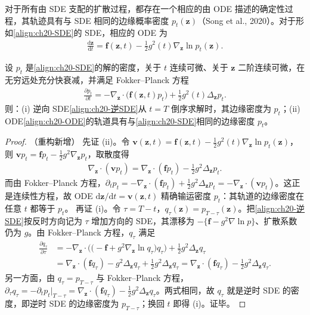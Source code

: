 \documentclass[../../main.tex]{subfiles}
\begin{document}
对于所有由 SDE 支配的扩散过程，都存在一个相应的由 ODE 描述的确定性过程，其轨迹具有与 SDE 相同的边缘概率密度 $p_t(\bm{z})$（Song et al., 2020）。对于形如\eqref{align:ch20-SDE}的 SDE，相应的 ODE 为
\begin{align}
\frac{\mathrm{d}\bm{z}}{\mathrm{d}t}=\bm{f}(\bm{z},t)-\frac{1}{2}g^2(t)\nabla_{\bm{z}}\ln p_t(\bm{z}).
\label{align:ch20-ODE}
\end{align}

\begin{proposition}\label{proposition:ch20-逆时SDE}
设 $p_t$ 是\eqref{align:ch20-SDE}的解的密度，关于 $t$ 连续可微、关于 $\bm{z}$ 二阶连续可微，在无穷远处充分快衰减，并满足 Fokker--Planck 方程
\begin{align*}
\frac{\partial p_t}{\partial t}=-\nabla_{\bm{z}}\cdot\big(\bm{f}(\bm{z},t)p_t\big)+\frac{1}{2}g^2(t)\Delta_{\bm{z}}p_t.
\end{align*}
则：(i) 逆向 SDE\eqref{align:ch20-逆SDE}从 $t=T$ 倒序求解时，其边缘密度为 $p_t$；(ii) ODE\eqref{align:ch20-ODE}的轨道具有与\eqref{align:ch20-SDE}相同的边缘密度 $p_t$。
\end{proposition}

\begin{proof}（重构新增）
先证 (ii)。令 $\bm{v}(\bm{z},t)=\bm{f}(\bm{z},t)-\frac{1}{2}g^2(t)\nabla_{\bm{z}}\ln p_t(\bm{z})$，则 $\bm{v}p_t=\bm{f}p_t-\frac{1}{2}g^2\nabla_{\bm{z}}p_t$，取散度得
\begin{align*}
\nabla_{\bm{z}}\cdot(\bm{v}p_t)=\nabla_{\bm{z}}\cdot(\bm{f}p_t)-\frac{1}{2}g^2\Delta_{\bm{z}}p_t.
\end{align*}
而由 Fokker--Planck 方程，$\partial_tp_t=-\nabla_{\bm{z}}\cdot(\bm{f}p_t)+\frac{1}{2}g^2\Delta_{\bm{z}}p_t=-\nabla_{\bm{z}}\cdot(\bm{v}p_t)$。这正是连续性方程，故 ODE $\mathrm{d}\bm{z}/\mathrm{d}t=\bm{v}(\bm{z},t)$ 精确输运密度 $p_t$：其轨道的边缘密度在任意 $t$ 都等于 $p_t$。
再证 (i)。令 $\tau=T-t$，$q_{\tau}(\bm{z})=p_{T-\tau}(\bm{z})$。把\eqref{align:ch20-逆SDE}按反时方向记为 $\tau$ 增加方向的 SDE，其漂移为 $-\big\{\bm{f}-g^2\nabla\ln p\big\}$、扩散系数仍为 $g$。由 Fokker--Planck 方程，$q_{\tau}$ 满足
\begin{align*}
\frac{\partial q_{\tau}}{\partial\tau}&=-\nabla_{\bm{z}}\cdot\Big(\big(-\bm{f}+g^2\nabla_{\bm{z}}\ln q_{\tau}\big)q_{\tau}\Big)+\frac{1}{2}g^2\Delta_{\bm{z}}q_{\tau}\\
&=\nabla_{\bm{z}}\cdot(\bm{f}q_{\tau})-g^2\Delta_{\bm{z}}q_{\tau}+\frac{1}{2}g^2\Delta_{\bm{z}}q_{\tau}=\nabla_{\bm{z}}\cdot(\bm{f}q_{\tau})-\frac{1}{2}g^2\Delta_{\bm{z}}q_{\tau}.
\end{align*}
另一方面，由 $q_{\tau}=p_{T-\tau}$ 与 Fokker--Planck 方程，$\partial_{\tau}q_{\tau}=-\partial_tp_t|_{T-\tau}=\nabla_{\bm{z}}\cdot(\bm{f}q_{\tau})-\frac{1}{2}g^2\Delta_{\bm{z}}q_{\tau}$。两式相同，故 $q_{\tau}$ 就是逆时 SDE 的密度，即逆时 SDE 的边缘密度为 $p_{T-\tau}$；换回 $t$ 即得 (i)。证毕。
\end{proof}
\end{document}
